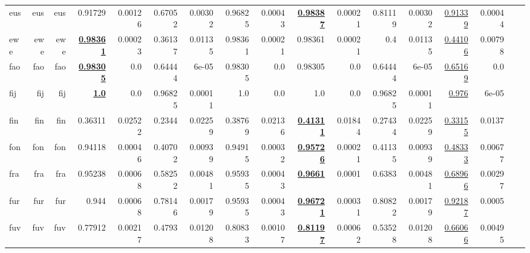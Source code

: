 \documentclass[11pt]{article}
\begin{document}
\begin{table*}[h]
{\begin{tabular}{lrrrrrrrrrrrrrrrr}
eus         & eus         & eus         & 0.91729         & 0.00126         & 0.67052         & 0.00302         & 0.96825         & 0.00043         & \textbf{\underline{0.98387}}         & 0.00021         & 0.81119         & 0.00302         & \underline{0.91339}         & 0.00044         \\
ewe         & ewe         & ewe         & \textbf{\underline{0.98361}}         & 0.00023         & 0.36137         & 0.01135         & 0.98361         & 0.00021         & 0.98361         & 0.00021         & 0.4         & 0.01135         & \underline{0.44106}         & 0.00798         \\
fao         & fao         & fao         & \textbf{\underline{0.98305}}         & 0.0         & 0.64444         & 6e-05         & 0.98305         & 0.0         & 0.98305         & 0.0         & 0.64444         & 6e-05         & \underline{0.65169}         & 0.0         \\
fij         & fij         & fij         & \textbf{\underline{1.0}}         & 0.0         & 0.96825         & 0.00011         & 1.0         & 0.0         & 1.0         & 0.0         & 0.96825         & 0.00011         & \underline{0.976}         & 6e-05         \\
fin         & fin         & fin         & 0.36311         & 0.02522         & 0.2344         & 0.02259         & 0.38769         & 0.02136         & \textbf{\underline{0.41311}}         & 0.01844         & 0.27434         & 0.02259         & \underline{0.33155}         & 0.0137         \\
fon         & fon         & fon         & 0.94118         & 0.00046         & 0.40702         & 0.00939         & 0.94915         & 0.00032         & \textbf{\underline{0.95726}}         & 0.00021         & 0.41135         & 0.00939         & \underline{0.48333}         & 0.00677         \\
fra         & fra         & fra         & 0.95238         & 0.00068         & 0.58252         & 0.00481         & 0.95935         & 0.00043         & \textbf{\underline{0.9661}}         & 0.0001         & 0.6383         & 0.00481         & \underline{0.68966}         & 0.00297         \\
fur         & fur         & fur         & 0.944         & 0.00068         & 0.78146         & 0.00179         & 0.95935         & 0.00043         & \textbf{\underline{0.96721}}         & 0.00031         & 0.80822         & 0.00179         & \underline{0.92187}         & 0.0005         \\
fuv         & fuv         & fuv         & 0.77912         & 0.00217         & 0.4793         & 0.01208         & 0.80833         & 0.00107         & \textbf{\underline{0.81197}}         & 0.00062         & 0.53528         & 0.01208         & \underline{0.66066}         & 0.00495         \\

\end{tabular}}
\end{table*}
\end{document}
